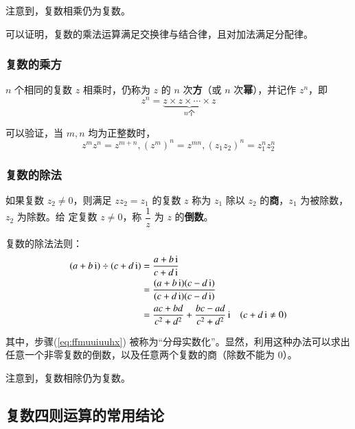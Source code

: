 \documentclass[a4paper,openany]{ctexbook}
\begin{document}
注意到，复数相乘仍为复数。

可以证明，复数的乘法运算满足交换律与结合律，且对加法满足分配律。

\subsubsection{复数的乘方}

\(n\) 个相同的复数 \(z\) 相乘时，仍称为 \(z\) 的 \(n\) 次\textbf{方}（或 \(n\) 次\textbf{幂}），并记作 \(z^n\)，即
\[z^n=\underbrace{z\times z\times \cdots \times z}_{n\text{个}}\]

可以验证，当 \(m,n\) 均为正整数时，
\[z^mz^n=z^{m+n},(z^m)^n=z^{mn},(z_1z_2)^n=z_1^nz_2^n\]

\subsubsection{复数的除法}

如果复数 \(z_2\ne 0\)，则满足 \(zz_2=z_1\) 的复数 \(z\) 称为 \(z_1\) 除以 \(z_2\) 的\textbf{商}，\(z_1\) 为被除数，\(z_2\) 为除数。给
定复数 \(z\ne 0\)，称 \(\dfrac{1}{z}\) 为 \(z\) 的\textbf{倒数}。

复数的除法法则：
\begin{align}
    (a+b\,\mathrm{i})\div (c+d\,\mathrm{i}) & =\frac{a+b\,\mathrm{i}}{c+d\,\mathrm{i}}                                              \notag                \\
                          & =\frac{(a+b\,\mathrm{i})(c-d\,\mathrm{i})}{(c+d\,\mathrm{i})(c-d\,\mathrm{i})}                          \label{eq:ffmuuiuuhx} \\
                          & =\frac{ac+bd}{c^2+d^2}+\frac{bc-ad}{c^2+d^2}\,\mathrm{i} \quad (c+d\,\mathrm{i}\ne 0) \notag
\end{align}

其中，步骤(\ref{eq:ffmuuiuuhx}) 被称为“分母实数化”。显然，利用这种办法可以求出任意一个非零复数的倒数，以及任意两个复数的商（除数不能为 \(0\)）。

注意到，复数相除仍为复数。

\subsection{复数四则运算的常用结论}
\end{document}
